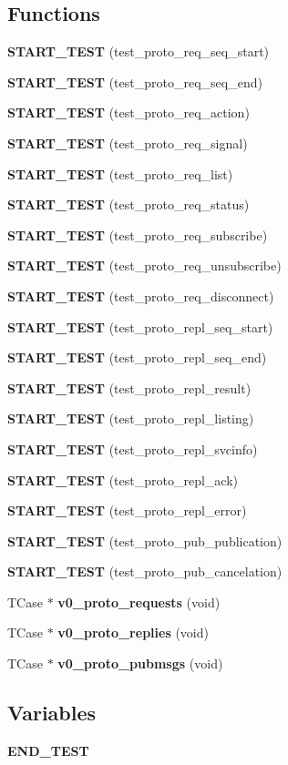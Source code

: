 \subsection*{Functions}
\begin{DoxyCompactItemize}
\item 
{\bf START\_\-TEST} (test\_\-proto\_\-req\_\-seq\_\-start)
\item 
{\bf START\_\-TEST} (test\_\-proto\_\-req\_\-seq\_\-end)
\item 
{\bf START\_\-TEST} (test\_\-proto\_\-req\_\-action)
\item 
{\bf START\_\-TEST} (test\_\-proto\_\-req\_\-signal)
\item 
{\bf START\_\-TEST} (test\_\-proto\_\-req\_\-list)
\item 
{\bf START\_\-TEST} (test\_\-proto\_\-req\_\-status)
\item 
{\bf START\_\-TEST} (test\_\-proto\_\-req\_\-subscribe)
\item 
{\bf START\_\-TEST} (test\_\-proto\_\-req\_\-unsubscribe)
\item 
{\bf START\_\-TEST} (test\_\-proto\_\-req\_\-disconnect)
\item 
{\bf START\_\-TEST} (test\_\-proto\_\-repl\_\-seq\_\-start)
\item 
{\bf START\_\-TEST} (test\_\-proto\_\-repl\_\-seq\_\-end)
\item 
{\bf START\_\-TEST} (test\_\-proto\_\-repl\_\-result)
\item 
{\bf START\_\-TEST} (test\_\-proto\_\-repl\_\-listing)
\item 
{\bf START\_\-TEST} (test\_\-proto\_\-repl\_\-svcinfo)
\item 
{\bf START\_\-TEST} (test\_\-proto\_\-repl\_\-ack)
\item 
{\bf START\_\-TEST} (test\_\-proto\_\-repl\_\-error)
\item 
{\bf START\_\-TEST} (test\_\-proto\_\-pub\_\-publication)
\item 
{\bf START\_\-TEST} (test\_\-proto\_\-pub\_\-cancelation)
\item 
TCase $\ast$ {\bf v0\_\-proto\_\-requests} (void)
\item 
TCase $\ast$ {\bf v0\_\-proto\_\-replies} (void)
\item 
TCase $\ast$ {\bf v0\_\-proto\_\-pubmsgs} (void)
\end{DoxyCompactItemize}
\subsection*{Variables}
\begin{DoxyCompactItemize}
\item 
{\bf END\_\-TEST}
\end{DoxyCompactItemize}


